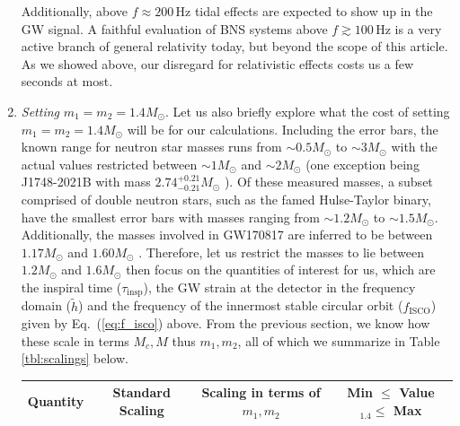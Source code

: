 \documentclass[11pt,a4paper]{article}
\begin{document}
\begin{enumerate}
Additionally, above $f \approx 200\,$Hz tidal effects are expected to show up in the GW signal.
A faithful evaluation of BNS systems above $f\gtrsim 100\,$Hz is a very active branch of general relativity today,
but beyond the scope of this article. As we showed above, our disregard for relativistic effects costs us a few seconds at most.%
%
\item {\it Setting} $m_1=m_2=1.4 M_\odot$.
Let us also briefly explore what the cost of setting $m_1=m_2=1.4 M_\odot$ will be for our calculations. 
Including the error bars, the known range for neutron star masses runs from $\sim 0.5 M_\odot$ to $ \sim 3 M_\odot$ with the actual values restricted
between $\sim 1 M_\odot$ and $\sim 2 M_\odot$ \cite{Ozel_Freire} (one exception being J1748-2021B with mass $2.74^{+0.21}_{-0.21} M_\odot $ \cite{Freire_et_al_2007}).
Of these measured masses, a subset comprised of double neutron stars, such as the famed Hulse-Taylor binary, have the smallest error bars with masses
ranging from $\sim 1.2 M_\odot$ to $\sim 1.5 M_\odot$. 
Additionally, the masses involved in GW170817 are inferred to be between $1.17 M_\odot$ and $1.60 M_\odot$ \cite{GW170817}.
Therefore, let us restrict the masses to lie between $1.2 M_\odot$ and $1.6 M_\odot$ then focus on %
the quantities of interest for us, which are %
the inspiral time ($\tau_\text{insp}$), the GW strain at the detector in the frequency domain ($\tilde{h}$) and
the frequency of the innermost stable circular orbit ($f_\text{ISCO}$) given by Eq.~(\ref{eq:f_isco}) above.
From the previous section, we know how these scale in terms $M_c, M$ thus $m_1, m_2$, all of which we summarize in Table \ref{tbl:scalings} below.
%
\begin{center}
\begin{table}[ht]
\begin{tabular}{|l|ccc|}
\hline
 Quantity & Standard Scaling & Scaling in terms of $m_1,m_2$ & Min $\le$ Value$_{1.4} \le$ Max\\
\hline

\end{tabular}
\end{table}
\end{center}
\end{enumerate}
\end{document}
